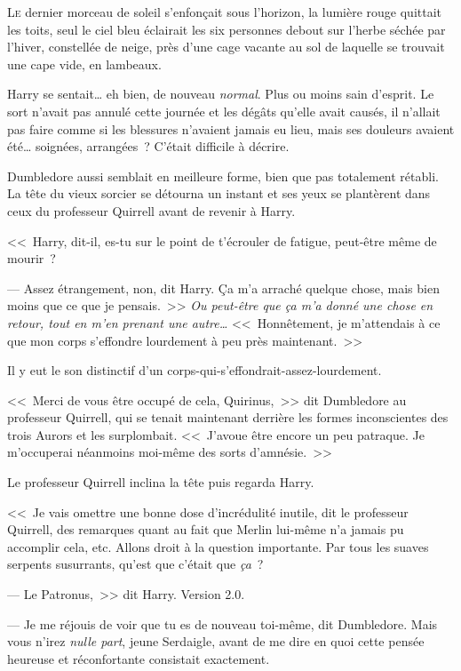 
\lettrine{L}{e} dernier morceau de soleil s'enfonçait sous l'horizon, la lumière rouge quittait les toits, seul le ciel bleu éclairait les six personnes debout sur l'herbe séchée par l'hiver, constellée de neige, près d'une cage vacante au sol de laquelle se trouvait une cape vide, en lambeaux.

Harry se sentait… eh bien, de nouveau \emph{normal}. Plus ou moins sain d'esprit. Le sort n'avait pas annulé cette journée et les dégâts qu'elle avait causés, il n'allait pas faire comme si les blessures n'avaient jamais eu lieu, mais ses douleurs avaient été… soignées, arrangées~? C'était difficile à décrire.

Dumbledore aussi semblait en meilleure forme, bien que pas totalement rétabli. La tête du vieux sorcier se détourna un instant et ses yeux se plantèrent dans ceux du professeur Quirrell avant de revenir à Harry.

<<~Harry, dit-il, es-tu sur le point de t'écrouler de fatigue, peut-être même de mourir~?

--- Assez étrangement, non, dit Harry. Ça m'a arraché quelque chose, mais bien moins que ce que je pensais.~>> \emph{Ou peut-être que ça m'a donné une chose en retour, tout en m'en prenant une autre…} <<~Honnêtement, je m'attendais à ce que mon corps s'effondre lourdement à peu près maintenant.~>>

Il y eut le son distinctif d'un corps-qui-s'effondrait-assez-lourdement.

<<~Merci de vous être occupé de cela, Quirinus,~>> dit Dumbledore au professeur Quirrell, qui se tenait maintenant derrière les formes inconscientes des trois Aurors et les surplombait. <<~J'avoue être encore un peu patraque. Je m'occuperai néanmoins moi-même des sorts d'amnésie.~>>

Le professeur Quirrell inclina la tête puis regarda Harry.

<<~Je vais omettre une bonne dose d'incrédulité inutile, dit le professeur Quirrell, des remarques quant au fait que Merlin lui-même n'a jamais pu accomplir cela, etc. Allons droit à la question importante. Par tous les suaves serpents susurrants, qu'est que c'était que \emph{ça}~?

--- Le Patronus,~>> dit Harry. Version 2.0.

--- Je me réjouis de voir que tu es de nouveau toi-même, dit Dumbledore. Mais vous n'irez \emph{nulle part}, jeune Serdaigle, avant de me dire en quoi cette pensée heureuse et réconfortante consistait exactement.

